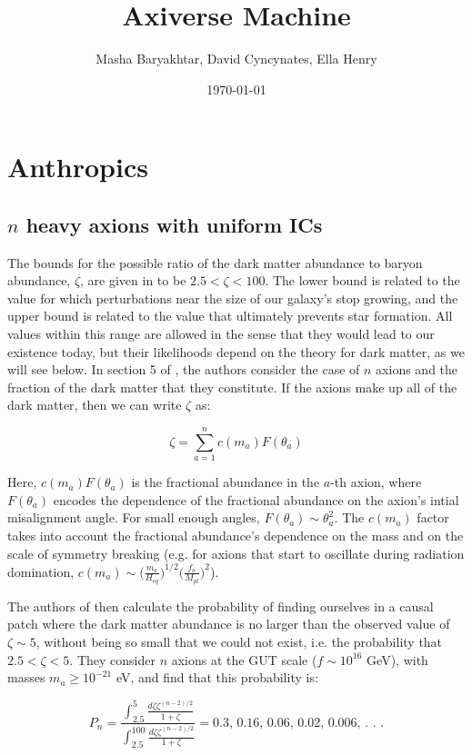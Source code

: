 \documentclass{article}
\title{Axiverse Machine}
\author{Masha Baryakhtar, David Cyncynates, Ella Henry}
\date{\today}
\begin{document}
\maketitle
\section{Anthropics}
\subsection{$n$ heavy axions with uniform ICs}
The bounds for the possible ratio of the dark matter abundance to baryon abundance, $\zeta$, are given in \cite{ben} to be $2.5<\zeta <100$. The lower bound is related to the value for which perturbations near the size of our galaxy's stop growing, and the upper bound is related to the value that ultimately prevents star formation. All values within this range are allowed in the sense that they would lead to our existence today, but their likelihoods depend on the theory for dark matter, as we will see below. In section 5 of \cite{bookkeeping}, the authors consider the case of $n$ axions and the fraction of the dark matter that they constitute. If the axions make up all of the dark matter, then we can write $\zeta$ as:

\begin{equation}
\label{eq:zeta}
    \zeta = \sum_{a=1}^n c(m_a) F(\theta_a)
\end{equation}

Here, $c(m_a)F(\theta_a)$ is the fractional abundance in the $a$-th axion, where $F(\theta_a)$ encodes the dependence of the fractional abundance on the axion's intial misalignment angle. For small enough angles, $F(\theta_a)\sim\theta_a^2$. The $c(m_a)$ factor takes into account the fractional abundance's dependence on the mass and on the scale of symmetry breaking (e.g. for axions that start to oscillate during radiation domination, $c(m_a) \sim \Big(\frac{m_a}{H_{eq}}\Big)^{1/2}\Big(\frac{f_a}{M_{pl}}\Big)^2$).

The authors of \cite{bookkeeping} then calculate the probability of finding ourselves in a causal patch where the dark matter abundance is no larger than the observed value of $\zeta \sim 5$, without being so small that we could not exist, i.e. the probability that $2.5<\zeta<5$. They consider $n$ axions at the GUT scale ($f\sim 10^{16}$ GeV), with masses $m_a\geq10^{-21}$ eV, and find that this probability is:

\begin{equation}
\label{eq:prob-result}
    P_n = \frac{\int_{2.5}^5 \frac{d\zeta \zeta^{(n-2)/2}}{1+\zeta}}{\int_{2.5}^{100}\frac{d\zeta \zeta^{(n-2)/2}}{1+\zeta}} = \text{0.3, 0.16, 0.06, 0.02, 0.006, . . .}
\end{equation}
\end{document}
